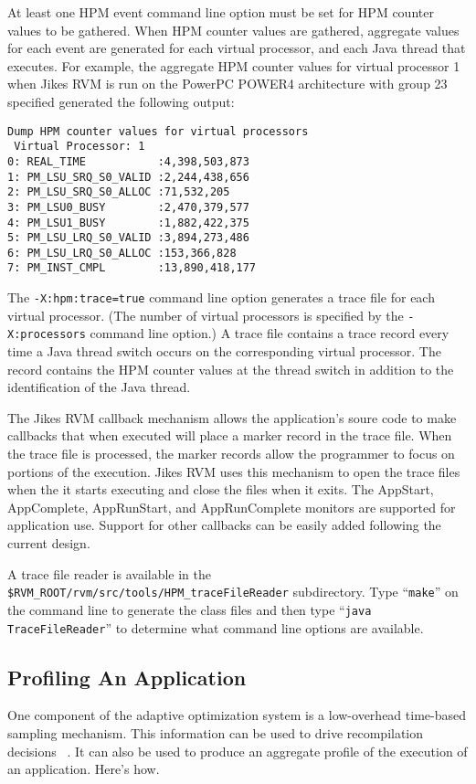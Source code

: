 At least one HPM event command line option must be set for HPM counter values to be gathered.  
When HPM counter values are gathered, aggregate values for each event 
are generated for each virtual processor, and each Java\TMweb{} thread that executes.
For example, the aggregate HPM counter values for virtual processor 1
when Jikes RVM is run on the PowerPC\TMweb{} POWER4 architecture with group 23 
specified generated the following output:

\begin{verbatim}
Dump HPM counter values for virtual processors
 Virtual Processor: 1
0: REAL_TIME           :4,398,503,873
1: PM_LSU_SRQ_S0_VALID :2,244,438,656
2: PM_LSU_SRQ_S0_ALLOC :71,532,205
3: PM_LSU0_BUSY        :2,470,379,577
4: PM_LSU1_BUSY        :1,882,422,375
5: PM_LSU_LRQ_S0_VALID :3,894,273,486
6: PM_LSU_LRQ_S0_ALLOC :153,366,828
7: PM_INST_CMPL        :13,890,418,177
\end{verbatim}

The {\tt -X:hpm:trace=true} command line option generates a trace file for each 
virtual processor. 
(The number of virtual processors is specified by the {\tt -X:processors} command line option.)
A trace file contains a trace record every time a Java thread switch occurs on the 
corresponding virtual processor.
The record contains the HPM counter values at the thread switch in addition to 
the identification of the Java thread.

The Jikes RVM callback mechanism allows the application's soure code 
to make callbacks that when executed will place a marker record in the trace file.
When the trace file is processed, the marker records allow the
programmer to focus on portions of the execution.
Jikes RVM uses this mechanism to open the trace files
when the it starts executing and close the files when it exits.
The AppStart, AppComplete, AppRunStart, and AppRunComplete monitors
are supported for application use.  
Support for other callbacks can be easily added following the current design.

A trace file reader is available in the {\tt \$RVM\_\-ROOT/rvm/src/tools/HPM\_\-trace\-Fi\-le\-Rea\-der}
subdirectory.  Type ``{\tt make}'' on the command line to generate the class files and then 
type ``{\tt java Trace\-Fi\-le\-Rea\-der}'' to determine what command line options are available.


\subsection{Profiling An Application}
One component of the adaptive optimization system is a low-overhead
time-based sampling mechanism.  This information can be used to drive
recompilation decisions
\T~\cite{jalapeno-adaptive-00}.
It can also be used to produce an aggregate
profile of the execution of an application.  
Here's how.

